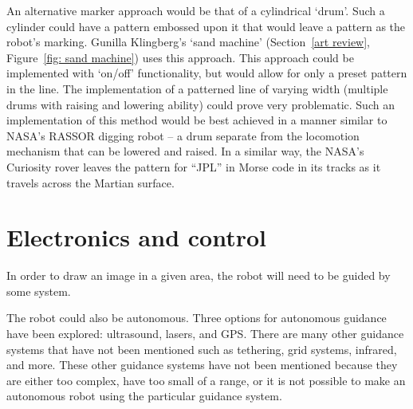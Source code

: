         An alternative marker approach would be that of a cylindrical `drum'. Such a cylinder could have a pattern embossed upon it that would leave a pattern as the robot's marking. Gunilla Klingberg's `sand machine' (Section~\ref{art review}, Figure~\ref{fig: sand machine}) uses this approach. This approach could be implemented with `on/off' functionality, but would allow for only a preset pattern in the line. The implementation of a patterned line of varying width (\eg multiple drums with raising and lowering ability) could prove very problematic. Such an implementation of this method would be best achieved in a manner similar to NASA's RASSOR digging robot -- a drum separate from the locomotion mechanism that can be lowered and raised.\cite{Siceloff2013} In a similar way, the NASA's Curiosity rover leaves the pattern for ``JPL'' in Morse code in its tracks as it travels across the Martian surface.

\section{Electronics and control}\label{outline: electronics and control}
    \label{outline: guidance}
        In order to draw an image in a given area, the robot will need to be guided by some system. 

        The robot could also be autonomous. Three options for autonomous guidance have been explored: ultrasound, lasers, and \gls{GPS}. There are many other guidance systems that have not been mentioned such as tethering, grid systems, infrared, and more. These other guidance systems have not been mentioned because they are either too complex, have too small of a range, or it is not possible to make an autonomous robot using the particular guidance system.

